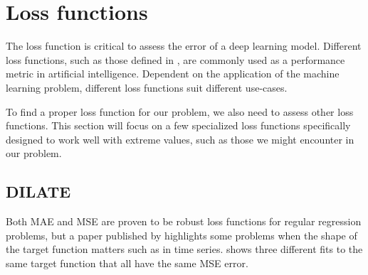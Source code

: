 
\section{Loss functions}
\label{section:RelatedWork:Loss}

The loss function is critical to assess the error of a deep learning model.
Different loss functions, such as those defined in ,
are commonly used as a performance metric in artificial intelligence.
Dependent on the application of the machine learning problem, different loss functions suit different use-cases.

To find a proper loss function for our problem, we also need to assess other loss functions.
This section will focus on a few specialized loss functions specifically designed to work well with extreme values, such as those we might encounter in our problem.

\subsection{DILATE}

Both MAE and MSE are proven to be robust loss functions for regular regression problems,
but a paper published by \citeauthor{Guen2019} highlights some problems when the shape of the target function matters
such as in time series.
 shows three different fits to the same target function that all have
the same MSE error.


